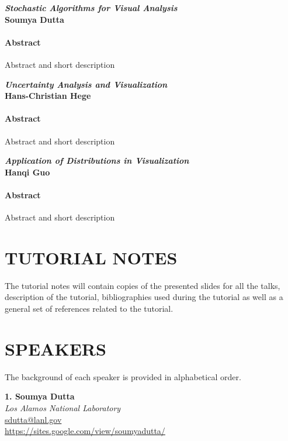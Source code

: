 \documentclass[preprint,journal]{vgtc}       %
\newcommand{\addverticalspace}{\vspace{3mm}}
\begin{document}
\addverticalspace

\noindent\textbf{\textit{Stochastic Algorithms for Visual Analysis}}\\
\textbf{Soumya Dutta}
\paragraph{Abstract}
Abstract and short description

\addverticalspace

\noindent\textbf{\textit{Uncertainty Analysis and Visualization}}\\
\textbf{Hans-Christian Hege}
\paragraph{Abstract}
Abstract and short description

\addverticalspace

\noindent\textbf{\textit{Application of Distributions in Visualization}}\\
\textbf{Hanqi Guo}
\paragraph{Abstract}
Abstract and short description

\addverticalspace

\section*{TUTORIAL NOTES}

The tutorial notes will contain copies of the presented slides for all the talks, description of the tutorial,  bibliographies used during the tutorial as well as a general set of references related to the tutorial.

\section*{SPEAKERS}
The background of each speaker is provided in alphabetical order.

\addverticalspace

\noindent \textbf{1. Soumya Dutta}\\
\emph{Los Alamos National Laboratory}\\
\href{mailto:sdutta@lanl.gov}{sdutta@lanl.gov}\\
\url{https://sites.google.com/view/soumyadutta/}

\addverticalspace
\end{document}
